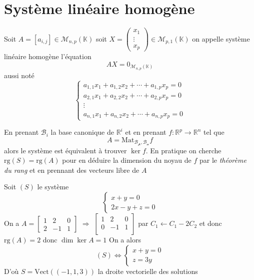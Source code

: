 \documentclass[11pt,colorlinks]{book}
\theoremstyle{mytheoremstyle}
\theoremstyle{mytheoremstyle}
\theoremstyle{mytheoremstyle}
\theoremstyle{mytheoremstyle}
\theoremstyle{mytheoremstyle}
\theoremstyle{mytheoremstyle}
\theoremstyle{mytheoremstyle}
\theoremstyle{mytheoremstyle}
\theoremstyle{myproblemstyle}
\def\mbb#1{\mathbb{#1}}
\def\bR{\mbb{R}}
\def\bK{\mbb{K}}
\begin{document}
\chapter{Système linéaire homogène}
\begin{definition}
  Soit $A = [a_{i,j}] \in \mathcal{M}_{n,p}(\bK)$ soit $X = \begin{pmatrix}
    x_1 \\ 
    \vdots \\ 
    x_p
  \end{pmatrix} \in \mathcal{M}_{p,1}(\bK)$ 
  on appelle système linéaire homogène l'équation 
  \begin{equation*}
    AX = 0_{\mathcal{M}_{n,p}(\bK)}
  \end{equation*}
  aussi noté 
  \begin{equation*}
    \begin{cases}
      a_{1,1} x_1 + a_{1,2} x_2 + \cdots + a_{1,p} x_p = 0 \\
      a_{2,1} x_1 + a_{2,2} x_2 + \cdots + a_{2,p} x_p = 0 \\ 
      \vdots \\ 
      a_{n,1} x_1 + a_{n,2} x_2 + \cdots + a_{n,p} x_p = 0
    \end{cases}
  \end{equation*}
\end{definition}
\begin{rmq}
  En prenant $\mathcal B_i$ la base canonique de $\bR^i$ et en prenant $f : \bR^p \to \bR^n$ tel que 
  \begin{equation*}
    A = \text{Mat}_{\mathcal{B_p},\mathcal{B_n}} f
  \end{equation*}
  alors le système est équivalent à trouver $\ker f$. En pratique on cherche $\text{rg}(S) = \text{rg}(A)$ pour en déduire 
  la dimension du noyau de $f$ par le \textit{théorème du rang} et en prennant des vecteurs libre de $A$ 
\end{rmq}
\begin{ex}
  Soit $(S)$ le système 
  \begin{equation*}
    \begin{cases}
      x+y = 0 \\ 
      2x - y + z = 0
    \end{cases}
  \end{equation*}
  On a $A = \begin{bmatrix}
    1 & 2 & 0 \\ 
    2 & -1 & 1
  \end{bmatrix}$ $\Rightarrow$ $\begin{bmatrix}
    1 & 2 & 0 \\
    0 & -1 & 1 \\
  \end{bmatrix}$ 
  par
  $C_1 \leftarrow C_1 - 2C_2$
  et donc $\text{rg}(A) = 2$ donc $\dim \ker A = 1$ 
  On a alors 
  \begin{equation*}
    (S) \Leftrightarrow \begin{cases}
      x+y = 0 \\ 
      z = 3y
    \end{cases}
  \end{equation*}
  D'où $S = \text{Vect}((-1,1,3))$ la droite vectorielle des solutions
\end{ex}
\end{document}
